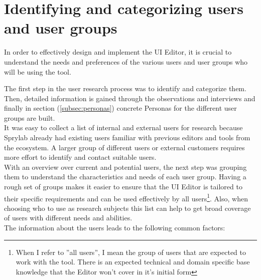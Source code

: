 \section{Identifying and categorizing users and user groups}
\label{sec:user-groups}
In order to effectively design and implement the UI Editor, it is crucial to understand the needs and preferences of the various users and user groups who will be using the tool.

The first step in the user research process was to identify and categorize them.
Then, detailed information is gained through the observations and interviews and finally in section (\ref{subsec:personas}) concrete Personas for the different user groups are built.
\\
It was easy to collect a list of internal and external users for research because Sprylab already had existing users familiar with previous editors and tools from the ecosystem.
A larger group of different users or external customers requires more effort to identify and contact suitable users.
\\
With an overview over current and potential users, the next step was grouping them to understand the characteristics and needs of each user group.
Having a rough set of groups makes it easier to ensure that the UI Editor is tailored to their specific requirements and can be used effectively by all users\footnote{When I refer to ''all users'', I mean the group of users that are expected to work with the tool. There is an expected technical and domain specific base knowledge that the Editor won't cover in it's initial form}.
Also, when choosing who to use as research subjects this list can help to get broad coverage of users with different needs and abilities.
\\
The information about the users leads to the following common factors:
